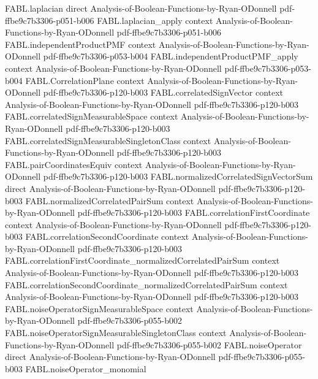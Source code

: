 \begin{theorem}
\proofstep
  {FABL.laplacian}
  {direct}
  {Analysis-of-Boolean-Functions-by-Ryan-ODonnell}
  {pdf-ffbe9c7b3306-p051-b006}
\proofstep
  {FABL.laplacian_apply}
  {context}
  {Analysis-of-Boolean-Functions-by-Ryan-ODonnell}
  {pdf-ffbe9c7b3306-p051-b006}
\proofstep
  {FABL.independentProductPMF}
  {context}
  {Analysis-of-Boolean-Functions-by-Ryan-ODonnell}
  {pdf-ffbe9c7b3306-p053-b004}
\proofstep
  {FABL.independentProductPMF_apply}
  {context}
  {Analysis-of-Boolean-Functions-by-Ryan-ODonnell}
  {pdf-ffbe9c7b3306-p053-b004}
\proofstep
  {FABL.CorrelationPlane}
  {context}
  {Analysis-of-Boolean-Functions-by-Ryan-ODonnell}
  {pdf-ffbe9c7b3306-p120-b003}
\proofstep
  {FABL.correlatedSignVector}
  {context}
  {Analysis-of-Boolean-Functions-by-Ryan-ODonnell}
  {pdf-ffbe9c7b3306-p120-b003}
\proofstep
  {FABL.correlatedSignMeasurableSpace}
  {context}
  {Analysis-of-Boolean-Functions-by-Ryan-ODonnell}
  {pdf-ffbe9c7b3306-p120-b003}
\proofstep
  {FABL.correlatedSignMeasurableSingletonClass}
  {context}
  {Analysis-of-Boolean-Functions-by-Ryan-ODonnell}
  {pdf-ffbe9c7b3306-p120-b003}
\proofstep
  {FABL.pairCoordinatesEquiv}
  {context}
  {Analysis-of-Boolean-Functions-by-Ryan-ODonnell}
  {pdf-ffbe9c7b3306-p120-b003}
\proofstep
  {FABL.normalizedCorrelatedSignVectorSum}
  {direct}
  {Analysis-of-Boolean-Functions-by-Ryan-ODonnell}
  {pdf-ffbe9c7b3306-p120-b003}
\proofstep
  {FABL.normalizedCorrelatedPairSum}
  {context}
  {Analysis-of-Boolean-Functions-by-Ryan-ODonnell}
  {pdf-ffbe9c7b3306-p120-b003}
\proofstep
  {FABL.correlationFirstCoordinate}
  {context}
  {Analysis-of-Boolean-Functions-by-Ryan-ODonnell}
  {pdf-ffbe9c7b3306-p120-b003}
\proofstep
  {FABL.correlationSecondCoordinate}
  {context}
  {Analysis-of-Boolean-Functions-by-Ryan-ODonnell}
  {pdf-ffbe9c7b3306-p120-b003}
\proofstep
  {FABL.correlationFirstCoordinate_normalizedCorrelatedPairSum}
  {context}
  {Analysis-of-Boolean-Functions-by-Ryan-ODonnell}
  {pdf-ffbe9c7b3306-p120-b003}
\proofstep
  {FABL.correlationSecondCoordinate_normalizedCorrelatedPairSum}
  {context}
  {Analysis-of-Boolean-Functions-by-Ryan-ODonnell}
  {pdf-ffbe9c7b3306-p120-b003}
\proofstep
  {FABL.noiseOperatorSignMeasurableSpace}
  {context}
  {Analysis-of-Boolean-Functions-by-Ryan-ODonnell}
  {pdf-ffbe9c7b3306-p055-b002}
\proofstep
  {FABL.noiseOperatorSignMeasurableSingletonClass}
  {context}
  {Analysis-of-Boolean-Functions-by-Ryan-ODonnell}
  {pdf-ffbe9c7b3306-p055-b002}
\proofstep
  {FABL.noiseOperator}
  {direct}
  {Analysis-of-Boolean-Functions-by-Ryan-ODonnell}
  {pdf-ffbe9c7b3306-p055-b003}
\proofstep
  {FABL.noiseOperator_monomial}

\end{theorem}
